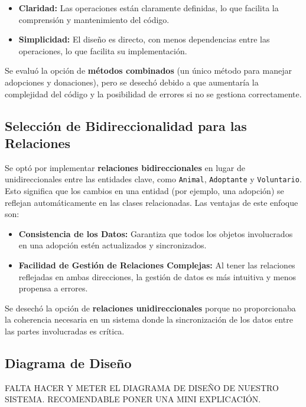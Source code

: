 \begin{itemize}
    \item \textbf{Claridad:} Las operaciones están claramente definidas, lo que facilita la comprensión y mantenimiento del código.
    \item \textbf{Simplicidad:} El diseño es directo, con menos dependencias entre las operaciones, lo que facilita su implementación.
\end{itemize}

Se evaluó la opción de \textbf{métodos combinados} (un único método para manejar adopciones y donaciones), pero se desechó debido a que aumentaría la complejidad del código y la posibilidad de errores si no se gestiona correctamente.

\subsection{Selección de Bidireccionalidad para las Relaciones}

Se optó por implementar \textbf{relaciones bidireccionales} en lugar de unidireccionales entre las entidades clave, como \texttt{Animal}, \texttt{Adoptante} y \texttt{Voluntario}. Esto significa que los cambios en una entidad (por ejemplo, una adopción) se reflejan automáticamente en las clases relacionadas. Las ventajas de este enfoque son:

\begin{itemize}
    \item \textbf{Consistencia de los Datos:} Garantiza que todos los objetos involucrados en una adopción estén actualizados y sincronizados.
    \item \textbf{Facilidad de Gestión de Relaciones Complejas:} Al tener las relaciones reflejadas en ambas direcciones, la gestión de datos es más intuitiva y menos propensa a errores.
\end{itemize}

Se desechó la opción de \textbf{relaciones unidireccionales} porque no proporcionaba la coherencia necesaria en un sistema donde la sincronización de los datos entre las partes involucradas es crítica.

\subsection{Diagrama de Diseño}

FALTA HACER Y METER EL DIAGRAMA DE DISEÑO DE NUESTRO SISTEMA. RECOMENDABLE PONER UNA MINI EXPLICACIÓN.

